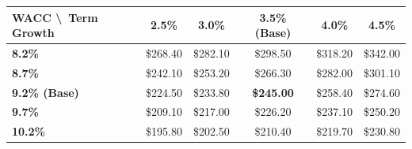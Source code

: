 \documentclass[10pt,a4paper]{scrartcl}
\begin{document}
{\small
\setlength{\tabcolsep}{3pt}
\begin{tabularx}{\textwidth}{@{} L C C C C C @{}}
\toprule
{}
\textbf{WACC \textbackslash\ Term Growth} & \textbf{2.5\%} & \textbf{3.0\%} & \textbf{3.5\% (Base)} & \textbf{4.0\%} & \textbf{4.5\%} \\
\midrule
\textbf{8.2\%} & \$268.40 & \$282.10 & \$298.50 & \$318.20 & \$342.00 \\
\textbf{8.7\%} & \$242.10 & \$253.20 & \$266.30 & \$282.00 & \$301.10 \\
\textbf{9.2\% (Base)} & \$224.50 & \$233.80 & \textbf{\$245.00} & \$258.40 & \$274.60 \\
\textbf{9.7\%} & \$209.10 & \$217.00 & \$226.20 & \$237.10 & \$250.20 \\
\textbf{10.2\%} & \$195.80 & \$202.50 & \$210.40 & \$219.70 & \$230.80 \\
\bottomrule
\end{tabularx}
}

\vspace{10pt}
\end{document}

